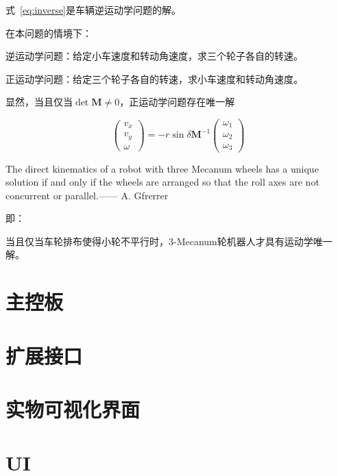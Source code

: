 式~\ref{eq:inverse}是车辆逆运动学问题的解。

在本问题的情境下：

\begin{definition}
    逆运动学问题：给定小车速度和转动角速度，求三个轮子各自的转速。
\end{definition}

\begin{definition}
    正运动学问题：给定三个轮子各自的转速，求小车速度和转动角速度。
\end{definition}

显然，当且仅当$\operatorname{det} \mathbf{M} \neq 0$，正运动学问题存在唯一解

\begin{equation}
    \left(\begin{array}{c}
    {v_{x}} \\
    {v_{y}} \\
    {\omega}
    \end{array}\right)=-r \sin \delta \mathbf{M}^{-1}\left(\begin{array}{c}
    {\omega_{1}} \\
    {\omega_{2}} \\
    {\omega_{3}}
    \end{array}\right)
\end{equation}

\begin{theorem}\label{the:theorem-en}
    The direct kinematics of a robot with three Mecanum wheels has a unique solution if and only if the wheels are arranged so that the roll axes are not concurrent or parallel.\hfill —— A. Gfrerrer
\end{theorem}

即：

\begin{theorem}\label{the:theorem-cn}
    当且仅当车轮排布使得小轮不平行时，3-Mecanum轮机器人才具有运动学唯一解。
\end{theorem}

\section{主控板}

\section{扩展接口}

\section{实物可视化界面}

\section{UI}
